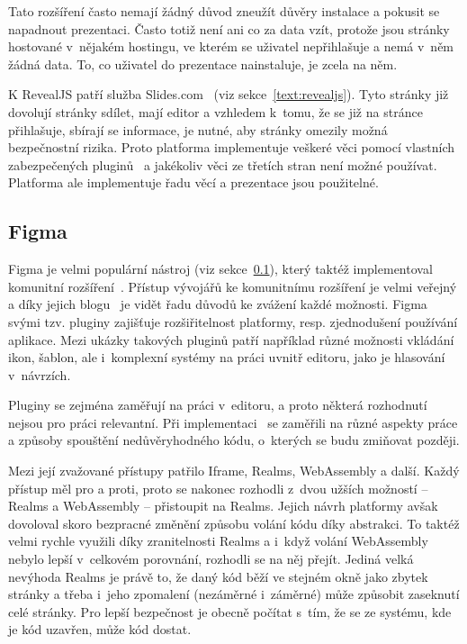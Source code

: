 Tato rozšíření často nemají žádný důvod zneužít důvěry instalace a pokusit se napadnout prezentaci.
Často totiž není ani co za data vzít, protože jsou stránky hostované v~nějakém hostingu, ve kterém se uživatel nepřihlašuje a nemá v~něm žádná data.
To, co uživatel do prezentace nainstaluje, je zcela na něm.

K RevealJS patří služba Slides.com~\cite{slidescom} (viz sekce~\ref{text:revealjs}).
Tyto stránky již dovolují stránky sdílet, mají editor a vzhledem k~tomu, že se již na stránce přihlašuje, sbírají se informace, je nutné, aby stránky omezily možná bezpečnostní rizika.
Proto platforma implementuje veškeré věci pomocí vlastních zabezpečených pluginů~\cite{slidescom} a jakékoliv věci ze třetích stran není možné používat.
Platforma ale implementuje řadu věcí a prezentace jsou použitelné.

\subsection{Figma}\label{text:figma}

Figma je velmi populární nástroj (viz sekce~\ref{text:figma}), který taktéž implementoval komunitní rozšíření~\cite{figma_website}.
Přístup vývojářů ke komunitnímu rozšíření je velmi veřejný a díky jejich blogu~\cite{figma_plugins_blog} je vidět řadu důvodů ke zvážení každé možnosti.
Figma svými tzv. pluginy zajišťuje rozšiřitelnost platformy, resp. zjednodušení používání aplikace.
Mezi ukázky takových pluginů patří například různé možnosti vkládání ikon, šablon, ale i~komplexní systémy na práci uvnitř editoru, jako je hlasování v~návrzích.

Pluginy se zejména zaměřují na práci v~editoru, a proto některá rozhodnutí nejsou pro práci relevantní.
Při implementaci~\cite{figma_plugins_blog} se zaměřili na různé aspekty práce a způsoby spouštění nedůvěryhodného kódu, o~kterých se budu zmiňovat později.

Mezi její zvažované přístupy patřilo Iframe, Realms, WebAssembly a další.
Každý přístup měl pro a proti, proto se nakonec rozhodli z~dvou užších možností -- Realms a WebAssembly -- přistoupit na Realms.
Jejich návrh platformy avšak dovoloval skoro bezpracné změnění způsobu volání kódu díky abstrakci.
To taktéž velmi rychle využili díky zranitelnosti Realms a i~když volání WebAssembly nebylo lepší v~celkovém porovnání, rozhodli se na něj přejít.
Jediná velká nevýhoda Realms je právě to, že daný kód běží ve stejném okně jako zbytek stránky a třeba i~jeho zpomalení (nezáměrné i~záměrné) může způsobit zaseknutí celé stránky.
Pro lepší bezpečnost je obecně počítat s~tím, že se ze systému, kde je kód uzavřen, může kód dostat.

